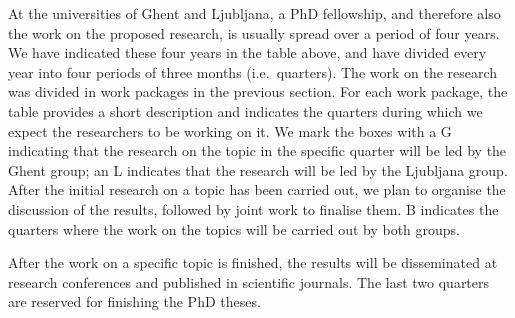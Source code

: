 \documentclass[11pt,dvipsnames,usenames,a4paper]{article}
\begin{document}
At the universities of Ghent and Ljubljana, a PhD fellowship, and therefore also the work on the proposed research, is usually spread over a period of four years.
We have indicated these four years in the table above, and have divided every year into four periods of three months (i.e.~quarters).
The work on the research was divided in work packages in the previous section.
For each work package, the table provides a short description and indicates the quarters during which we expect the researchers to be working on it.
We mark the boxes with a G indicating that the research on the topic in the specific quarter will be led by the Ghent group; an L indicates that the research will be led by the Ljubljana group. 
After the initial research on a topic has been carried out, we plan to organise the discussion of the results, followed by joint work to finalise them. 
B indicates the quarters where the work on the topics will be carried out by both groups. 

After the work on a specific topic is finished, the results will be disseminated at research conferences and published in scientific journals. 
The last two quarters are reserved for finishing the PhD theses. 





\end{document}
